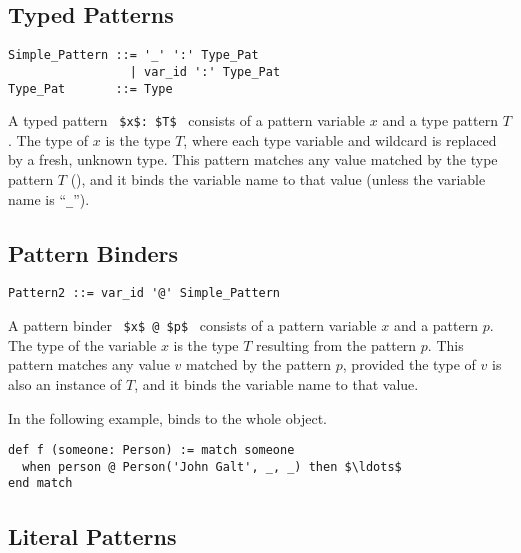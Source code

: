 \subsection{Typed Patterns}
\label{sec:typed-patterns}

\syntax\begin{lstlisting}
Simple_Pattern ::= '_' ':' Type_Pat
                 | var_id ':' Type_Pat
Type_Pat       ::= Type
\end{lstlisting}

A typed pattern ~\lstinline!$x$: $T$!~ consists of a pattern variable $x$ and a type pattern $T$. The type of $x$ is the type $T$, where each type variable and wildcard is replaced by a fresh, unknown type. This pattern matches any value matched by the type pattern $T$ (), and it binds the variable name to that value (unless the variable name is ``\lstinline!_!''). 






\subsection{Pattern Binders}
\label{sec:pattern-binders}

\syntax\begin{lstlisting}
Pattern2 ::= var_id '@' Simple_Pattern
\end{lstlisting}

A pattern binder ~\lstinline!$x$ @ $p$!~ consists of a pattern variable $x$ and a pattern $p$. The type of the variable $x$ is the type $T$ resulting from the pattern $p$. This pattern matches any value $v$ matched by the pattern $p$, provided the type of $v$ is also an instance of $T$, and it binds the variable name to that value. 

\example In the following example,  binds to the whole  object. 
\begin{lstlisting}
def f (someone: Person) := match someone
  when person @ Person('John Galt', _, _) then $\ldots$
end match
\end{lstlisting}







\subsection{Literal Patterns}
\label{sec:literal-patterns}

